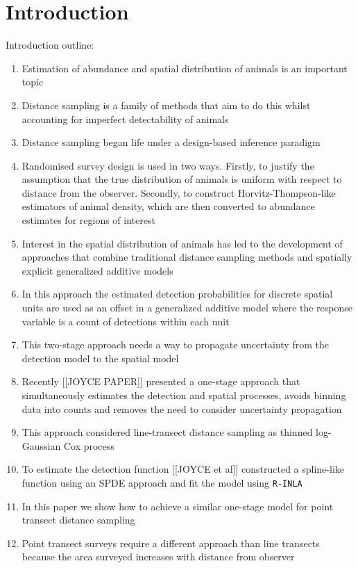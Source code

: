 \documentclass[preprint,12pt]{elsarticle}
\begin{document}
\section*{Introduction}

Introduction outline:
\begin{enumerate}
	\item Estimation of abundance and spatial distribution of animals is an important topic
	\item Distance sampling is a family of methods that aim to do this whilst accounting for imperfect detectability of animals
	\item Distance sampling began life under a design-based inference paradigm
	\item Randomised survey design is used in two ways.  Firstly, to justify the assumption that the true distribution of animals is uniform with respect to distance from the observer.  Secondly, to construct Horvitz-Thompson-like estimators of animal density, which are then converted to abundance estimates for regions of interest
	\item Interest in the spatial distribution of animals has led to the development of approaches that combine traditional distance sampling methods and spatially explicit generalized additive models
	\item In this approach the estimated detection probabilities for discrete spatial units are used as an offset in a generalized additive model where the response variable is a count of detections within each unit
	\item This two-stage approach needs a way to propagate uncertainty from the detection model to the spatial model
	\item Recently [[JOYCE PAPER]] presented a one-stage approach that simultaneously estimates the detection and spatial processes, avoids binning data into counts and removes the need to consider uncertainty propagation
	\item This approach considered line-transect distance sampling as thinned log-Gaussian Cox process
	\item To estimate the detection function [[JOYCE et al]] constructed a spline-like function using an SPDE approach and fit the model using \texttt{R-INLA}
	\item In this paper we show how to achieve a similar one-stage model for point transect distance sampling
	\item Point transect surveys require a different approach than line transects because the area surveyed increases with distance from observer

\end{enumerate}
\end{document}

